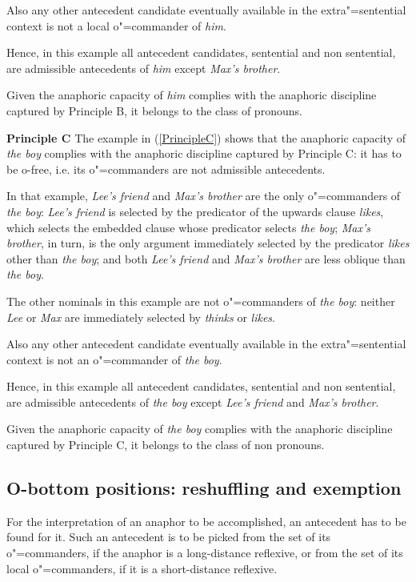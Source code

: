 \documentclass[output=paper
,modfonts
,nonflat]{langsci/langscibook}
\begin{document}
Also any other antecedent candidate eventually available in the extra"=sentential context is not
a local o"=commander of {\em him}.

Hence, in this example all antecedent candidates, sentential and non sentential, are admissible 
antecedents of {\em him} except {\em Max's brother}.

Given the anaphoric capacity of {\em him} complies with  the anaphoric discipline captured 
by Principle B, it belongs to the class of pronouns.


{\bf Principle C} The example in (\ref{PrincipleC}) shows that the anaphoric capacity of {\em the boy} complies with 
the anaphoric discipline captured by Principle C: it has to be o-free, i.e. its o"=commanders are not admissible antecedents. 

In that example, {\em Lee's friend} and {\em Max's brother} are the only o"=commanders of {\em the boy}: 
{\em Lee's friend} is selected by the predicator of the upwards
clause {\em likes}, which selects the embedded clause whose predicator selects
{\em the boy}; {\em Max's brother}, in turn, is the only argument immediately selected by 
the predicator {\em likes} other than {\em the boy};
and both {\em Lee's friend} and {\em Max's brother} are less oblique than {\em the boy}.

The other nominals in this example are not o"=commanders of {\em the boy}: neither {\em Lee} or {\em Max} 
are immediately selected by {\em thinks} or {\em likes}.

Also any other antecedent candidate eventually available in the extra"=sentential context is not
an o"=commander of {\em the boy}.

Hence, in this example all antecedent candidates, sentential and non sentential, are admissible antecedents of {\em the boy} except {\em Lee's friend} and {\em Max's brother}.

Given the anaphoric capacity of {\em the boy} complies with  the anaphoric discipline captured 
by Principle C, it belongs to the class of non pronouns.






\subsection{O-bottom positions: reshuffling and exemption}\label{Exemption}

For the interpretation of an anaphor to be accomplished,
an antecedent has to be found for it. Such an antecedent is to be picked from
the set of its o"=commanders, if the anaphor is a long-distance reflexive, 
or from the set of its local o"=commanders, if it is a short-distance reflexive.
\end{document}
